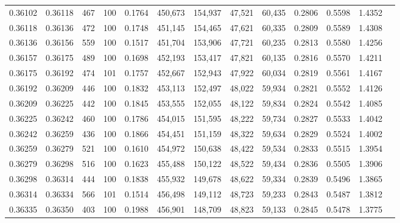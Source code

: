 \begin{tabular}{rrrrrrrrrrrrr}
0.36102 & 0.36118 &   467 & 100 &                                     0.1764 & 450,673 & 154,937 &  47,521 &  60,435 & 0.2806 & 0.5598 & 1.4352 \\
0.36118 & 0.36136 &   472 & 100 &                                     0.1748 & 451,145 & 154,465 &  47,621 &  60,335 & 0.2809 & 0.5589 & 1.4308 \\
0.36136 & 0.36156 &   559 & 100 &                                     0.1517 & 451,704 & 153,906 &  47,721 &  60,235 & 0.2813 & 0.5580 & 1.4256 \\
0.36157 & 0.36175 &   489 & 100 &                                     0.1698 & 452,193 & 153,417 &  47,821 &  60,135 & 0.2816 & 0.5570 & 1.4211 \\
0.36175 & 0.36192 &   474 & 101 &                                     0.1757 & 452,667 & 152,943 &  47,922 &  60,034 & 0.2819 & 0.5561 & 1.4167 \\
0.36192 & 0.36209 &   446 & 100 &                                     0.1832 & 453,113 & 152,497 &  48,022 &  59,934 & 0.2821 & 0.5552 & 1.4126 \\
0.36209 & 0.36225 &   442 & 100 &                                     0.1845 & 453,555 & 152,055 &  48,122 &  59,834 & 0.2824 & 0.5542 & 1.4085 \\
0.36225 & 0.36242 &   460 & 100 &                                     0.1786 & 454,015 & 151,595 &  48,222 &  59,734 & 0.2827 & 0.5533 & 1.4042 \\
0.36242 & 0.36259 &   436 & 100 &                                     0.1866 & 454,451 & 151,159 &  48,322 &  59,634 & 0.2829 & 0.5524 & 1.4002 \\
0.36259 & 0.36279 &   521 & 100 &                                     0.1610 & 454,972 & 150,638 &  48,422 &  59,534 & 0.2833 & 0.5515 & 1.3954 \\
0.36279 & 0.36298 &   516 & 100 &                                     0.1623 & 455,488 & 150,122 &  48,522 &  59,434 & 0.2836 & 0.5505 & 1.3906 \\
0.36298 & 0.36314 &   444 & 100 &                                     0.1838 & 455,932 & 149,678 &  48,622 &  59,334 & 0.2839 & 0.5496 & 1.3865 \\
0.36314 & 0.36334 &   566 & 101 &                                     0.1514 & 456,498 & 149,112 &  48,723 &  59,233 & 0.2843 & 0.5487 & 1.3812 \\
0.36335 & 0.36350 &   403 & 100 &                                     0.1988 & 456,901 & 148,709 &  48,823 &  59,133 & 0.2845 & 0.5478 & 1.3775 \\

\end{tabular}
